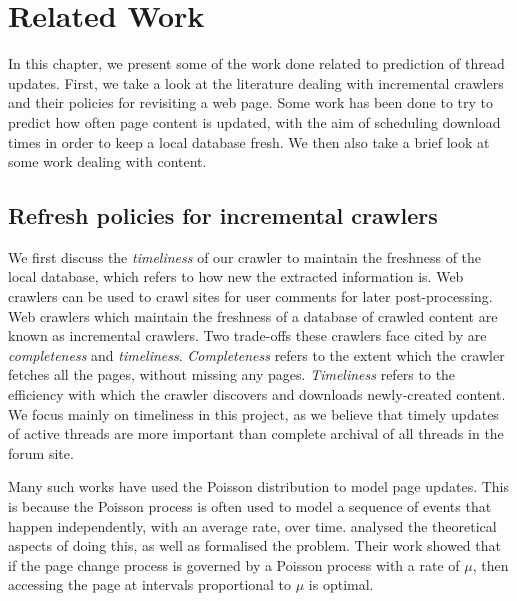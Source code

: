 \chapter{Related Work}
In this chapter, we present some of the work done related to prediction of 
thread updates. First, we take a look at the literature dealing with incremental 
crawlers and their policies for revisiting a web page. Some work has been done 
to try to predict how often page content is updated, with the aim of scheduling 
download times in order to keep a local database fresh. We then also take a 
brief look at some work dealing with content.

 


\section{Refresh policies for incremental crawlers}

We first discuss the \emph{timeliness} of our crawler to maintain the freshness 
of the local database, which refers to how new the extracted information is. Web 
crawlers can be used to crawl sites for user comments for 
later post-processing. Web crawlers which maintain the freshness of a database of 
crawled content are known as incremental crawlers. Two trade-offs these crawlers 
face cited by  are \emph{completeness} and \emph{timeliness}.  
\emph{Completeness} refers to the extent which the crawler fetches all the 
pages, without missing any pages. \emph{Timeliness} refers to the efficiency 
with which the crawler discovers and downloads newly-created content. We focus 
mainly on timeliness in this project, as we believe that timely updates of 
active threads are more important than complete archival of all threads in the 
forum site.

Many such works have used the Poisson distribution to model page updates.  
This is because the Poisson process is often used to model a sequence of events 
that happen independently, with an average rate, over time.  
 analysed the theoretical aspects of doing this, as well as 
formalised the problem. Their work showed that if the page change process is 
governed by a Poisson process with a rate of $\mu$, then accessing the page at 
intervals proportional to $\mu$ is optimal.

